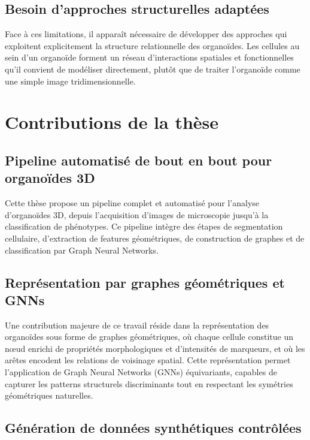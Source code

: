 \subsection{Besoin d'approches structurelles adaptées}

Face à ces limitations, il apparaît nécessaire de développer des approches qui exploitent explicitement la structure relationnelle des organoïdes. Les cellules au sein d'un organoïde forment un réseau d'interactions spatiales et fonctionnelles qu'il convient de modéliser directement, plutôt que de traiter l'organoïde comme une simple image tridimensionnelle.

\section{Contributions de la thèse}

\subsection{Pipeline automatisé de bout en bout pour organoïdes 3D}

Cette thèse propose un pipeline complet et automatisé pour l'analyse d'organoïdes 3D, depuis l'acquisition d'images de microscopie jusqu'à la classification de phénotypes. Ce pipeline intègre des étapes de segmentation cellulaire, d'extraction de features géométriques, de construction de graphes et de classification par Graph Neural Networks.

\subsection{Représentation par graphes géométriques et GNNs}

Une contribution majeure de ce travail réside dans la représentation des organoïdes sous forme de graphes géométriques, où chaque cellule constitue un nœud enrichi de propriétés morphologiques et d'intensités de marqueurs, et où les arêtes encodent les relations de voisinage spatial. Cette représentation permet l'application de Graph Neural Networks (GNNs) équivariants, capables de capturer les patterns structurels discriminants tout en respectant les symétries géométriques naturelles.

\subsection{Génération de données synthétiques contrôlées}

